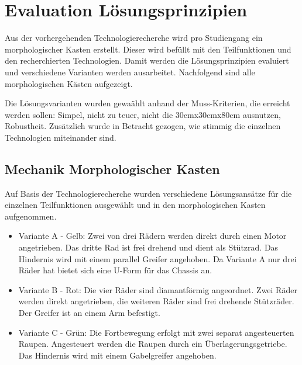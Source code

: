 \section{Evaluation Lösungsprinzipien}

Aus der vorhergehenden Technologierecherche wird pro Studiengang ein morphologischer Kasten erstellt. Dieser wird befüllt mit den Teilfunktionen und den recherchierten Technologien. Damit werden die Lösungsprinzipien evaluiert und verschiedene Varianten werden ausarbeitet. Nachfolgend sind alle morphologischen Kästen aufgezeigt.

Die Lösungsvarianten wurden gewaählt anhand der Muss-Kriterien, die erreicht werden sollen: Simpel, nicht zu teuer, nicht die 30cmx30cmx80cm ausnutzen, Robustheit. Zusätzlich wurde in Betracht gezogen, wie stimmig die einzelnen Technologien miteinander sind.

\subsection{Mechanik Morphologischer Kasten}

Auf Basis der Technologierecherche wurden verschiedene Lösungsansätze für die einzelnen Teilfunktionen ausgewählt und in den morphologischen Kasten aufgenommen.

\begin{itemize}
    \item Variante A - Gelb: Zwei von drei Rädern werden direkt durch einen Motor angetrieben. Das dritte Rad ist frei drehend und dient als Stützrad. Das Hindernis wird mit einem parallel Greifer angehoben. Da Variante A nur drei Räder hat bietet sich eine U-Form für das Chassis an. 
    \item Variante B - Rot: Die vier Räder sind diamantförmig angeordnet. Zwei Räder werden direkt angetrieben, die weiteren Räder sind frei drehende Stützräder. Der Greifer ist an einem Arm befestigt. 
    \item Variante C - Grün: Die Fortbewegung erfolgt mit zwei separat angesteuerten Raupen. Angesteuert werden die Raupen durch ein Überlagerungsgetriebe. Das Hindernis wird mit einem Gabelgreifer angehoben. 
\end{itemize}

